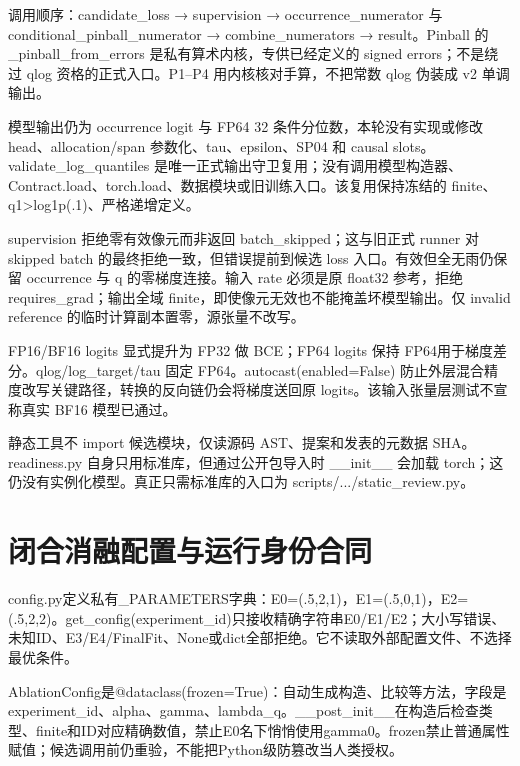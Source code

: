 \documentclass[UTF8,fontset=fandol,10pt]{ctexart}
\begin{document}
调用顺序：candidate\_\allowbreak{}loss → supervision → occurrence\_\allowbreak{}numerator 与 conditional\_\allowbreak{}pinball\_\allowbreak{}numerator → combine\_\allowbreak{}numerators → result。Pinball 的 \_\allowbreak{}pinball\_\allowbreak{}from\_\allowbreak{}errors 是私有算术内核，专供已经定义的 signed errors；不是绕过 qlog 资格的正式入口。P1–P4 用内核核对手算，不把常数 qlog 伪装成 v2 单调输出。

模型输出仍为 occurrence logit 与 FP64 32 条件分位数，本轮没有实现或修改 head、allocation/\allowbreak{}span 参数化、tau、epsilon、SP04 和 causal slots。validate\_\allowbreak{}log\_\allowbreak{}quantiles 是唯一正式输出守卫复用；没有调用模型构造器、Contract.load、torch.load、数据模块或旧训练入口。该复用保持冻结的 finite、q1>log1p(.1)、严格递增定义。

supervision 拒绝零有效像元而非返回 batch\_\allowbreak{}skipped；这与旧正式 runner 对 skipped batch 的最终拒绝一致，但错误提前到候选 loss 入口。有效但全无雨仍保留 occurrence 与 q 的零梯度连接。输入 rate 必须是原 float32 参考，拒绝 requires\_\allowbreak{}grad；输出全域 finite，即使像元无效也不能掩盖坏模型输出。仅 invalid reference 的临时计算副本置零，源张量不改写。

FP16/\allowbreak{}BF16 logits 显式提升为 FP32 做 BCE；FP64 logits 保持 FP64用于梯度差分。qlog/\allowbreak{}log\_\allowbreak{}target/\allowbreak{}tau 固定 FP64。autocast(enabled=False) 防止外层混合精度改写关键路径，转换的反向链仍会将梯度送回原 logits。该输入张量层测试不宣称真实 BF16 模型已通过。

静态工具不 import 候选模块，仅读源码 AST、提案和发表的元数据 SHA。readiness.py 自身只用标准库，但通过公开包导入时 \_\allowbreak{}\_\allowbreak{}init\_\allowbreak{}\_\allowbreak{} 会加载 torch；这仍没有实例化模型。真正只需标准库的入口为 scripts/\allowbreak{}.../\allowbreak{}static\_\allowbreak{}review.py。
\clearpage\section{闭合消融配置与运行身份合同}

config.py定义私有\_\allowbreak{}PARAMETERS字典：E0=(.5,2,1)，E1=(.5,0,1)，E2=(.5,2,2)。get\_\allowbreak{}config(experiment\_\allowbreak{}id)只接收精确字符串E0/\allowbreak{}E1/\allowbreak{}E2；大小写错误、未知ID、E3/\allowbreak{}E4/\allowbreak{}FinalFit、None或dict全部拒绝。它不读取外部配置文件、不选择最优条件。

AblationConfig是@dataclass(frozen=True)：自动生成构造、比较等方法，字段是experiment\_\allowbreak{}id、alpha、gamma、lambda\_\allowbreak{}q。\_\allowbreak{}\_\allowbreak{}post\_\allowbreak{}init\_\allowbreak{}\_\allowbreak{}在构造后检查类型、finite和ID对应精确数值，禁止E0名下悄悄使用gamma0。frozen禁止普通属性赋值；候选调用前仍重验，不能把Python级防篡改当人类授权。
\end{document}
